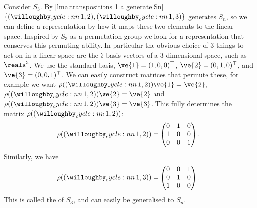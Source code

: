 \documentclass[fleqn]{NotesClass}
\newcommand*{\trans}{\top}
\begin{document}
    Consider \(S_3\).
    By \cref{lma:transpositions 1 a generate Sn} \(\{\cycle{1, 2}, \cycle{1, 3}\}\) generates \(S_n\), so we can define a representation by how it maps these two elements to the linear space.
    Inspired by \(S_3\) as a permutation group we look for a representation that conserves this permuting ability.
    In particular the obvious choice of 3 things to act on in a linear space are the 3 basis vectors of a 3-dimensional space, such as \(\reals^3\).
    We use the standard basis, \(\ve{1} = (1, 0, 0)^\trans\), \(\ve{2} = (0, 1, 0)^\trans\), and \(\ve{3} = (0, 0, 1)^\trans\).
    We can easily construct matrices that permute these, for example we want \(\rho(\cycle{1, 2})\ve{1} = \ve{2}\), \(\rho(\cycle{1, 2})\ve{2} = \ve{2}\) and \(\rho(\cycle{1, 2})\ve{3} = \ve{3}\).
    This fully determines the matrix \(\rho(\cycle{1, 2})\):
    \begin{equation}
        \rho(\cycle{1, 2}) = 
        \begin{pmatrix}
            0 & 1 & 0\\
            1 & 0 & 0\\
            0 & 0 & 1
        \end{pmatrix}
        .
    \end{equation}
    Similarly, we have
    \begin{equation}
        \rho(\cycle{1, 3}) = 
        \begin{pmatrix}
            0 & 0 & 1\\
            0 & 1 & 0\\
            1 & 0 & 0
        \end{pmatrix}
        .
    \end{equation}
    This is called the  of \(S_3\), and can easily be generalised to \(S_n\).
    
\end{document}
